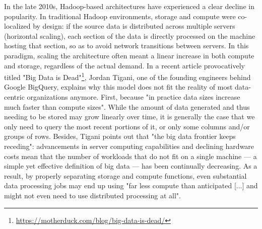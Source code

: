 \documentclass[graybox]{svmult}
\begin{document}
In the late 2010s, Hadoop-based architectures have experienced a clear decline in popularity. In traditional Hadoop environments, storage and compute were co-localized by design: if the source data is distributed across multiple servers (horizontal scaling), each section of the data is directly processed on the machine hosting that section, so as to avoid network transitions between servers. In this paradigm, scaling the architecture often meant a linear increase in both compute and storage, regardless of the actual demand. In a recent article provocatively titled "Big Data is Dead"\footnote{\url{https://motherduck.com/blog/big-data-is-dead/}}, Jordan Tigani, one of the founding engineers behind Google BigQuery, explains why this model does not fit the reality of most data-centric organizations anymore. First, because "in practice data sizes increase much faster than compute sizes". While the amount of data generated and thus needing to be stored may grow linearly over time, it is generally the case that we only need to query the most recent portions of it, or only some columns and/or groups of rows. Besides, Tigani points out that "the big data frontier keeps receding": advancements in server computing capabilities and declining hardware costs mean that the number of workloads that do not fit on a single machine — a simple yet effective definition of big data — has been continually decreasing. As a result, by properly separating storage and compute functions, even substantial data processing jobs may end up using "far less compute than anticipated [...] and might not even need to use distributed processing at all".
\end{document}
